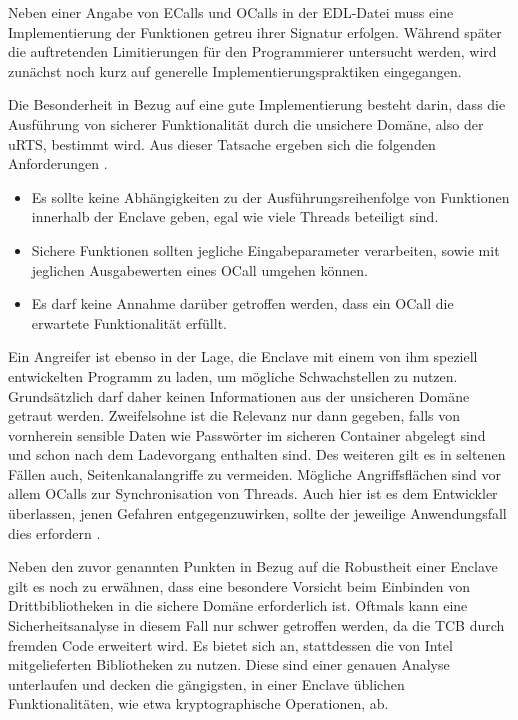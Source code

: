 Neben einer Angabe von \acp{ECall} und \acp{OCall} in der \ac{EDL}-Datei muss eine Implementierung der Funktionen getreu ihrer Signatur erfolgen. Während später die auftretenden Limitierungen für den Programmierer untersucht werden, wird zunächst noch kurz auf generelle Implementierungspraktiken eingegangen. 

Die Besonderheit in Bezug auf eine gute Implementierung besteht darin, dass die Ausführung von sicherer Funktionalität durch die unsichere Domäne, also der \ac{uRTS}, bestimmt wird. Aus dieser Tatsache ergeben sich die folgenden Anforderungen \cite{WinGuide}.

\begin{itemize}
	\item Es sollte keine Abhängigkeiten zu der Ausführungsreihenfolge von Funktionen innerhalb der Enclave geben, egal wie viele Threads beteiligt sind.
	\item Sichere Funktionen sollten jegliche Eingabeparameter verarbeiten, sowie mit jeglichen Ausgabewerten eines \ac{OCall} umgehen können.
	\item Es darf keine Annahme darüber getroffen werden, dass ein \ac{OCall} die erwartete Funktionalität erfüllt.
\end{itemize}

Ein Angreifer ist ebenso in der Lage, die Enclave mit einem von ihm speziell entwickelten Programm zu laden, um mögliche Schwachstellen zu nutzen. Grundsätzlich darf daher keinen Informationen aus der unsicheren Domäne getraut werden. Zweifelsohne ist die Relevanz nur dann gegeben, falls von vornherein sensible Daten wie Passwörter im sicheren Container abgelegt sind und schon nach dem Ladevorgang enthalten sind. Des weiteren gilt es in seltenen Fällen auch, Seitenkanalangriffe zu vermeiden. Mögliche Angriffsflächen sind vor allem \acp{OCall} zur Synchronisation von Threads. Auch hier ist es dem Entwickler überlassen, jenen Gefahren entgegenzuwirken, sollte der jeweilige Anwendungsfall dies erfordern \cite{M.2016}.

Neben den zuvor genannten Punkten in Bezug auf die Robustheit einer Enclave gilt es noch zu erwähnen, dass eine besondere Vorsicht beim Einbinden von Drittbibliotheken in die sichere Domäne erforderlich ist. Oftmals kann eine Sicherheitsanalyse in diesem Fall nur schwer getroffen werden, da die \ac{TCB} durch fremden Code erweitert wird. Es bietet sich an, stattdessen die von Intel mitgelieferten Bibliotheken zu nutzen. Diese sind einer genauen Analyse unterlaufen und decken die gängigsten, in einer Enclave üblichen Funktionalitäten, wie etwa kryptographische Operationen, ab.

